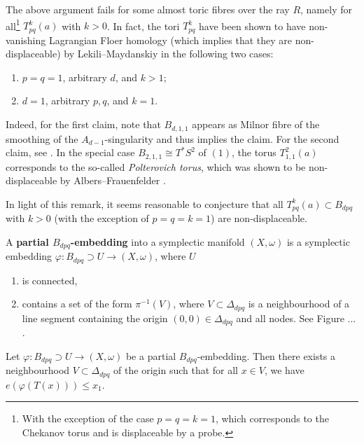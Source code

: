 \documentclass[12pt,a4paper,draft]{scrartcl}
\begin{document}
\begin{remark}
    The above argument fails for some almost toric fibres over the ray $R$, namely for all\footnote{With the exception of the case $p=q=k=1$, which corresponds to the Chekanov torus and is displaceable by a probe.} $T^k_{pq}(a)$ with $k > 0$. In fact, the tori $T^k_{pq}$ have been shown to have non-vanishing Lagrangian Floer homology (which implies that they are non-displaceable) by Lekili--Maydanskiy \cite{LekMay14} in the following two cases:
    \begin{enumerate}
        \item $p = q = 1$, arbitrary $d$, and $k > 1$;
        \item $d = 1$, arbitrary $p,q$, and $k = 1$.
    \end{enumerate}
    Indeed, for the first claim, note that $B_{d,1,1}$ appears as Milnor fibre of the smoothing of the $A_{d-1}$-singularity and thus \cite[Proposition 2.20]{LekMay14} implies the claim. For the second claim, see \cite[Proposition 3.6]{LekMay14}. In the special case $B_{2,1,1} \cong T^*S^2$ of $(1)$, the torus $T_{1,1}^2(a)$ corresponds to the so-called \emph{Polterovich torus}, which was shown to be non-displaceable by Albers--Frauenfelder \cite{AlbFra08}. 
\end{remark}

In light of this remark, it seems reasonable to conjecture that all $T^k_{pq}(a) \subset B_{dpq}$ with $k > 0$ (with the exception of $p=q=k=1$) are non-displaceable. 

\begin{definition}
    \label{def:partial_embedding}
    A \textbf{partial $B_{dpq}$-embedding} into a symplectic manifold $(X,\omega)$ is a symplectic embedding $φ:B_{dpq} ⊃ U → (X,ω)$, where $U$ 
    \begin{enumerate}
        \item is connected, 
        \item contains a set of the form $\pi^{-1}(V)$, where $V \subset \Delta_{dpq}$ is a neighbourhood of a line segment containing the origin $(0,0) \in \Delta_{dpq}$ and all nodes.  See Figure ... .   
    \end{enumerate}
\end{definition}

\begin{proposition}
\label{thm:upper_bound_embedded}
  Let $φ:B_{dpq} ⊃ U → (X,ω)$ be a partial $B_{dpq}$-embedding. Then there exists a neighbourhood $V \subset \Delta_{dpq}$ of the origin such that for all $x \in V$, we have $e(φ(T(x))) \leq x_1$.
\end{proposition}
\end{document}

